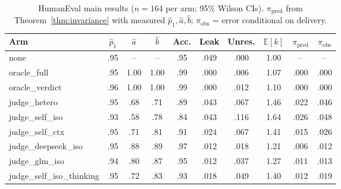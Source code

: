 \documentclass[10pt]{article}
\begin{document}
\begin{table}[t]
\centering\small
\caption{HumanEval main results ($n{=}164$ per arm; 95\% Wilson
CIs).  $\pi_{\mathrm{pred}}$ from Theorem~\ref{thm:invariance}
with measured $\hat p_1,\hat a,\hat b$; $\pi_{\mathrm{obs}}$ =
error conditional on delivery.}
\label{tab:main}
\begin{tabular}{lccccccccc}
\toprule
Arm & $\hat p_1$ & $\hat a$ & $\hat b$ & Acc. & Leak &
Unres. & $\mathbb{E}[k]$ & $\pi_{\mathrm{pred}}$ &
$\pi_{\mathrm{obs}}$\\
\midrule
none & .95 & -- & -- & .95 & .049 & .000 & 1.00 & -- & --\\
oracle\_full & .95 & 1.00 & 1.00 & .99 & .000 & .006 & 1.07 & .000 & .000\\
oracle\_verdict & .96 & 1.00 & 1.00 & .99 & .000 & .012 & 1.10 & .000 & .000\\
judge\_hetero & .95 & .68 & .71 & .89 & .043 & .067 & 1.46 & .022 & .046\\
judge\_self\_iso & .93 & .58 & .78 & .84 & .043 & .116 & 1.64 & .026 & .048\\
judge\_self\_ctx & .95 & .71 & .81 & .91 & .024 & .067 & 1.41 & .015 & .026\\
judge\_deepseek\_iso & .95 & .88 & .89 & .97 & .012 & .018 & 1.21 & .006 & .012\\
judge\_glm\_iso & .94 & .80 & .87 & .95 & .012 & .037 & 1.27 & .011 & .013\\
judge\_self\_iso\_thinking & .95 & .72 & .83 & .93 & .018 & .049 & 1.40 & .012 & .019\\
\bottomrule
\end{tabular}
\end{table}
\end{document}
